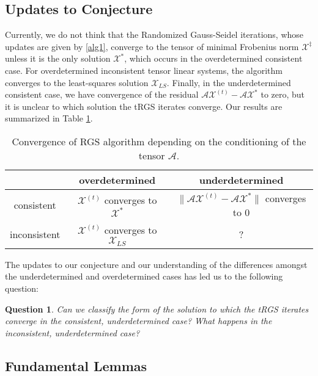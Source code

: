 \documentclass[10.5pt]{amsart}
\newtheorem{question}{Question}
\newcommand{\tens}[1]{\bm{\mathcal{#1}}}
\def\tA{{\tens{A}}}  %
\def\tX{{\tens{X}}}  %
\begin{document}
\subsection{Updates to Conjecture}
Currently, we do not think that the Randomized Gauss-Seidel iterations, whose updates are given by \eqref{alg1}, converge to the tensor of minimal Frobenius norm $\tX^\ddagger$ unless it is the only solution $\tX^\ast$, which occurs in the  overdetermined consistent  case.
For overdetermined inconsistent tensor linear systems, the algorithm converges to the least-squares solution $\tX_{LS}$. Finally, in the underdetermined consistent case, we have convergence of the residual $\tA\tX^{(t)} - \tA\tX^\ast$ to zero, but it is unclear to which solution the tRGS iterates converge. Our results are summarized in Table \ref{tab: cases}.

\begin{table}[h!]
    \centering
   \begin{tabular}{|c|c|c|}\hline
     & overdetermined & underdetermined \\\hline
    consistent &$\tX^{(t)}$ converges to $\tX^*$ &
$\| \tA\tX^{(t)} - \tA\tX^\ast\|$ converges to 0 \\\hline 
inconsistent &
$\tX^{(t)}$ converges to $\tX_{LS}$ &
? \\\hline 
\end{tabular}
\vspace{2mm}
    \caption{ Convergence of RGS algorithm depending on the conditioning of the tensor $\tA$.}
    \label{tab: cases}
\end{table}

The updates to our conjecture and our understanding of the differences amongst the underdetermined and overdetermined cases has led us to the following question:

\begin{question}
    Can we classify the form of the solution to which the tRGS iterates converge in the consistent, underdetermined case?  What happens in the inconsistent, underdetermined case? \label{ques:underdetermined case}
\end{question}

\subsection{Fundamental Lemmas}
\end{document}
